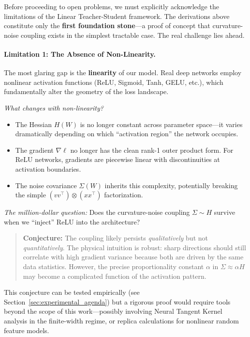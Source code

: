 \documentclass[
  journal=largetwo,
  year=2025,
  volume=37,
]{cup-journal}
\begin{document}
Before proceeding to open problems, we must explicitly acknowledge the limitations of the Linear Teacher-Student framework. The derivations above constitute only the \textbf{first foundation stone}---a proof of concept that curvature-noise coupling exists in the simplest tractable case. The real challenge lies ahead.

\paragraph{Limitation 1: The Absence of Non-Linearity.}

The most glaring gap is the \textbf{linearity} of our model. Real deep networks employ nonlinear activation functions (ReLU, Sigmoid, Tanh, GELU, etc.), which fundamentally alter the geometry of the loss landscape.

\textit{What changes with non-linearity?}
\begin{itemize}
    \item The Hessian $H(W)$ is no longer constant across parameter space---it varies dramatically depending on which ``activation region'' the network occupies.
    \item The gradient $\nabla \ell$ no longer has the clean rank-1 outer product form. For ReLU networks, gradients are piecewise linear with discontinuities at activation boundaries.
    \item The noise covariance $\Sigma(W)$ inherits this complexity, potentially breaking the simple $(v v^\top) \otimes (x x^\top)$ factorization.
\end{itemize}

\textit{The million-dollar question:} Does the curvature-noise coupling $\Sigma \sim H$ survive when we ``inject'' ReLU into the architecture?

\begin{quote}
\textbf{Conjecture:} The coupling likely persists \textit{qualitatively} but not \textit{quantitatively}. The physical intuition is robust: sharp directions should still correlate with high gradient variance because both are driven by the same data statistics. However, the precise proportionality constant $\alpha$ in $\Sigma \approx \alpha H$ may become a complicated function of the activation pattern.
\end{quote}

This conjecture can be tested empirically (see Section~\ref{sec:experimental_agenda}) but a rigorous proof would require tools beyond the scope of this work---possibly involving Neural Tangent Kernel analysis in the finite-width regime, or replica calculations for nonlinear random feature models.
\end{document}
